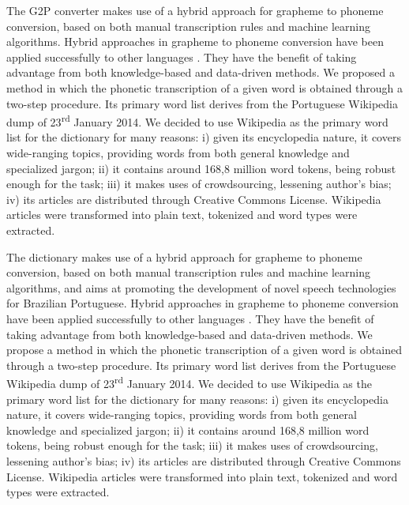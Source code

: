 The G2P converter makes use of a hybrid approach for grapheme to phoneme conversion, based on both manual transcription rules and machine learning algorithms. Hybrid approaches in grapheme to phoneme conversion have been applied successfully to other languages \cite{Damper1998, Polyakova2006, Teixeira2006, Veiga2013}. They have the benefit of taking advantage from both knowledge-based and data-driven methods. We proposed a method in which the phonetic transcription of a given word is obtained through a two-step procedure. Its primary word list derives from the Portuguese Wikipedia dump of 23\textsuperscript{rd} January 2014. We decided to use Wikipedia as the primary word list for the dictionary for many reasons: i) given its encyclopedia nature, it covers wide-ranging topics, providing words from both general knowledge and specialized jargon; ii) it contains around 168,8 million word tokens, being robust enough for the task; iii) it makes uses of crowdsourcing, lessening author's bias; iv) its articles are distributed through Creative Commons License. Wikipedia articles were transformed into plain text, tokenized and word types were extracted.

The dictionary makes use of a hybrid approach for grapheme to phoneme conversion, based on both manual transcription rules and machine learning algorithms, and aims at promoting the development of novel speech technologies for Brazilian Portuguese. Hybrid approaches in grapheme to phoneme conversion have been applied successfully to other languages \cite{Damper1998}\cite{Polyakova2006}\cite{Teixeira2006}\cite{Veiga2013}. They have the benefit of taking advantage from both knowledge-based and data-driven methods. We propose a method in which the phonetic transcription of a given word is obtained through a two-step procedure. Its primary word list derives from the Portuguese Wikipedia dump of 23\textsuperscript{rd} January 2014. We decided to use Wikipedia as the primary word list for the dictionary for many reasons: i) given its encyclopedia nature, it covers wide-ranging topics, providing words from both general knowledge and specialized jargon; ii) it contains around 168,8 million word tokens, being robust enough for the task; iii) it makes uses of crowdsourcing, lessening author's bias; iv) its articles are distributed through Creative Commons License. Wikipedia articles were transformed into plain text, tokenized and word types were extracted.


